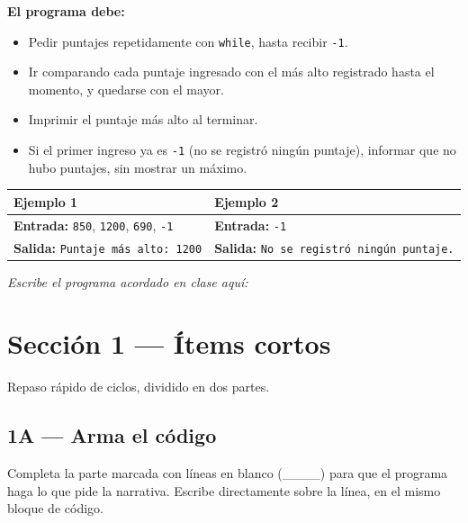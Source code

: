 \documentclass[11pt]{article}
\begin{document}
\textbf{El programa debe:}
\begin{itemize}
  \item Pedir puntajes repetidamente con \texttt{while}, hasta recibir \texttt{-1}.
  \item Ir comparando cada puntaje ingresado con el más alto registrado hasta el momento, y quedarse con el mayor.
  \item Imprimir el puntaje más alto al terminar.
  \item Si el primer ingreso ya es \texttt{-1} (no se registró ningún puntaje), informar que no hubo puntajes, sin mostrar un máximo.
\end{itemize}


\vspace{1mm}
{\footnotesize
\renewcommand{\arraystretch}{0.85}
\setlength{\tabcolsep}{4pt}
\noindent\begin{tabularx}{\linewidth}{|Y|Y|}
\hline
\textbf{Ejemplo 1} & \textbf{Ejemplo 2} \\
\hline
\textbf{Entrada:} \texttt{850}, \texttt{1200}, \texttt{690}, \texttt{-1} & \textbf{Entrada:} \texttt{-1} \\
\hline
\textbf{Salida:} \texttt{Puntaje más alto: 1200} & \textbf{Salida:} \texttt{No se registró ningún puntaje.} \\
\hline
\end{tabularx}
}

\vspace{2mm}\textit{Escribe el programa acordado en clase aquí:}
\begin{cajaescribe}[height=8.5cm]
\end{cajaescribe}

\newpage
\section*{Sección 1 --- Ítems cortos}
Repaso rápido de ciclos, dividido en dos partes.

\subsection*{1A --- Arma el código}
Completa la parte marcada con líneas en blanco (\_\_\_\_) para que el programa haga lo que pide la narrativa. Escribe directamente sobre la línea, en el mismo bloque de código.
\end{document}
